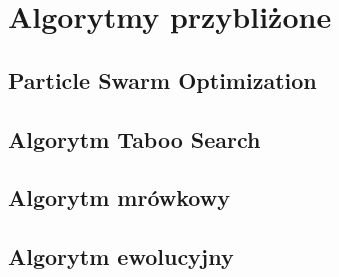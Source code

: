 \chapter{Algorytmy przybliżone}
\label{cha:algorytmy}

\section{Particle Swarm Optimization}
\label{sec:PSO}

\section{Algorytm Taboo Search}
\label{sec:TS}

\section{Algorytm mrówkowy}
\label{sec:mrowka}

\section{Algorytm ewolucyjny}
\label{sec:AE}